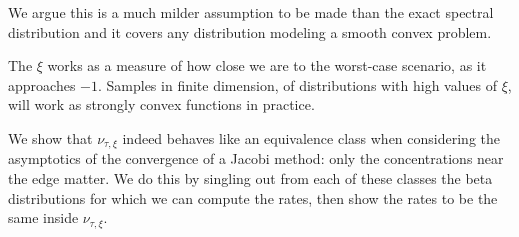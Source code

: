 \documentclass{article}
\begin{document}
We argue this is a much milder assumption to be made than the exact spectral distribution and it covers any distribution modeling a smooth convex problem. 


The $\xi$ works as a measure of how close we are to the worst-case scenario, as it approaches $-1$. Samples in finite dimension, of distributions with high values of $\xi$, will work as strongly convex functions in practice.


We show that $\nu_{\tau,\xi}$ indeed behaves like an equivalence class when considering the asymptotics of the convergence of a Jacobi method: only the concentrations near the edge matter. We do this by singling out from each of these classes the beta distributions for which we can compute the rates, then show the rates to be the same inside $\nu_{\tau,\xi}$.
\end{document}
